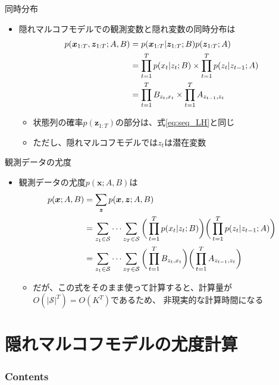 \documentclass[aspectratio=169,unicode,dvipdfmx,14pt]{beamer}
\begin{document}
\begin{frame}{同時分布}
\begin{itemize}
\item 隠れマルコフモデルでの観測変数と隠れ変数の同時分布は
\begin{align}
p(\bm{x}_{1:T}, \bm{z}_{1:T};A,B)
& = p(\bm{x}_{1:T} | \bm{z}_{1:T};B) p(\bm{z}_{1:T};A)
\notag \\ &
= \prod_{t=1}^T p(x_t|z_t;B) \times \prod_{t=1}^T p(z_t|z_{t-1};A)
\notag \\ &
= \prod_{t=1}^T B_{z_t,x_t} \times \prod_{t=1}^T A_{z_{t-1},z_t}
\end{align}
\begin{itemize}
\item 状態列の確率$p(\bm{z}_{1:T})$の部分は、式\eqref{eq:seq_LH}と同じ
\item ただし、隠れマルコフモデルでは$z_t$は潜在変数
\end{itemize}
\end{itemize}
\end{frame}


\begin{frame}{観測データの尤度}
\begin{itemize}
\item 観測データの尤度$p(\bm{x}; A,B)$は
\begin{align}
p(\bm{x}; A,B) &
= \sum_{\bm{z}} p(\bm{x},\bm{z}; A,B)
\notag \\
& = \sum_{z_1 \in \mathcal{S}} \cdots \sum_{z_T \in \mathcal{S}}
\bigg( \prod_{t=1}^T p(x_t|z_t;B) \bigg) \bigg( \prod_{t=1}^T p(z_t|z_{t-1};A) \bigg)
\notag \\ & 
= \sum_{z_1 \in \mathcal{S}} \cdots \sum_{z_T \in \mathcal{S}} \bigg( \prod_{t=1}^T B_{z_t,x_t} \bigg)
\bigg( \prod_{t=1}^T A_{z_{t-1},z_t} \bigg)
\end{align}
\vspace{-.1in}
\begin{itemize}
\item だが、この式をそのまま使って計算すると、計算量が$O(|\mathcal{S}|^T) = O(K^T)$であるため、
非現実的な計算時間になる
\end{itemize}
\end{itemize}
\end{frame}

\section{隠れマルコフモデルの尤度計算}

\begin{frame}\frametitle{Contents}
\Large \tableofcontents[currentsection]
\end{frame}
\end{document}
